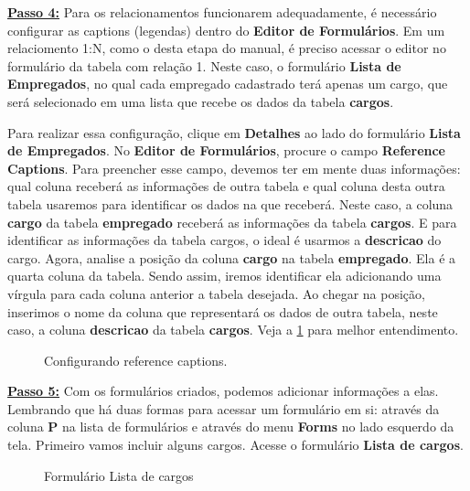 \documentclass[9pt]{report}
\begin{document}
{      \underline{\textbf{Passo 4:}} Para os relacionamentos
      funcionarem adequadamente, é necessário configurar as captions
      (legendas) dentro do \textbf{Editor de Formulários}. Em um
      relaciomento 1:N, como o desta etapa do manual, é preciso
      acessar o editor no formulário da tabela com relação 1. Neste
      caso, o formulário \textbf{Lista de Empregados}, no qual cada
      empregado cadastrado terá apenas um cargo, que será selecionado
      em uma lista que recebe os dados da tabela \textbf{cargos}.

      Para realizar essa configuração, clique em \textbf{Detalhes} ao
      lado do formulário \textbf{Lista de Empregados}. No
      \textbf{Editor de Formulários}, procure o campo
      \textbf{Reference Captions}. Para preencher esse campo, devemos
      ter em mente duas informações: qual coluna receberá as
      informações de outra tabela e qual coluna desta outra tabela
      usaremos para identificar os dados na que receberá. Neste caso,
      a coluna \textbf{cargo} da tabela \textbf{empregado} receberá
      as informações da tabela \textbf{cargos}. E para identificar as
      informações da tabela cargos, o ideal é usarmos a
      \textbf{descricao} do cargo. Agora, analise a posição da coluna
      \textbf{cargo} na tabela \textbf{empregado}. Ela é a quarta
      coluna da tabela. Sendo assim, iremos identificar ela
      adicionando uma vírgula para cada coluna anterior a tabela
      desejada. Ao chegar na posição, inserimos o nome da coluna que
      representará os dados de outra tabela, neste caso, a coluna
      \textbf{descricao} da tabela \textbf{cargos}. Veja a
      \figurename{ \ref{fig:referencecaptions}} para melhor
      entendimento.

      \begin{figure}[H]
        \caption{Configurando reference captions.}
        \label{fig:referencecaptions}
      \end{figure}
      
      \underline{\textbf{Passo 5:}} Com os formulários criados,
      podemos adicionar informações a elas. Lembrando que há duas
      formas para acessar um formulário em si: através da coluna
      \textbf{P} na lista de formulários e através do menu
      \textbf{Forms} no lado esquerdo da tela. Primeiro vamos incluir
      alguns cargos. Acesse o formulário \textbf{Lista de cargos}.

       \begin{figure}[H]
        \caption{Formulário Lista de cargos}
        \label{fig:listacargos}
       \end{figure}

}
\end{document}
